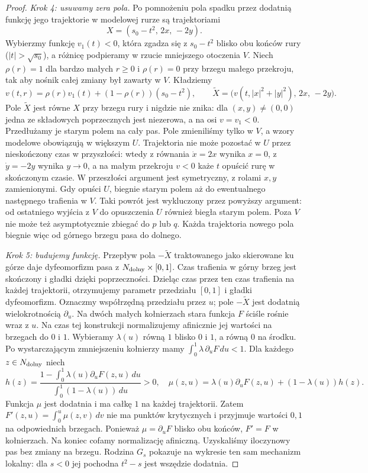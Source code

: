 \begin{proof}
\emph{Krok 4: usuwamy zera pola.}
Po pomnożeniu pola spadku przez
dodatnią funkcję jego trajektorie
w modelowej rurze są trajektoriami
\[
 X=(s_0-t^2,\,2x,\,-2y).
\]
Wybierzmy funkcję $v_1(t)<0$,
która zgadza się z $s_0-t^2$
blisko obu końców rury
($|t|>\sqrt{s_0}$), a różnicę podpieramy
w rzucie mniejszego otoczenia $V$. Niech
$\rho(r)=1$ dla bardzo małych
$r\geq0$ i $\rho(r)=0$ przy
brzegu małego przekroju, tak aby nośnik całej
zmiany był zawarty w $V$. Kładziemy
\[
 v(t,r)=\rho(r)v_1(t)
       +(1-\rho(r))(s_0-t^2),\qquad
 \widetilde X=
 \bigl(v(t,|x|^2+|y|^2),\,2x,\,-2y\bigr).
\]
Pole $\widetilde X$ jest równe $X$
przy brzegu rury i nigdzie nie
znika: dla $(x,y)\ne(0,0)$ jedna
ze składowych poprzecznych jest
niezerowa, a na osi $v=v_1<0$.
Przedłużamy je starym polem na cały pas.
Pole zmieniliśmy tylko w $V$, a wzory modelowe
obowiązują w większym $U$. Trajektoria nie może
pozostać w $U$ przez nieskończony czas
w przyszłości: wtedy z równania
$\dot x=2x$ wynika $x=0$,
z $\dot y=-2y$ wynika $y\to0$,
a na małym przekroju $v<0$
każe $t$ opuścić rurę w skończonym
czasie. W przeszłości argument
jest symetryczny, z rolami $x,y$
zamienionymi. Gdy opuści $U$, biegnie starym polem
aż do ewentualnego następnego trafienia w $V$.
Taki powrót jest wykluczony przez powyższy argument:
od ostatniego wyjścia z $V$ do opuszczenia $U$
również biegła starym polem. Poza $V$ nie może
też asymptotycznie zbiegać do $p$ lub $q$.
Każda trajektoria nowego pola biegnie więc od górnego
brzegu pasa do dolnego.

\emph{Krok 5: budujemy funkcję.}
Przepływ pola $-\widetilde X$
traktowanego jako skierowane ku
górze daje dyfeomorfizm pasa
z $N_{\rm dolny}\times[0,1]$.
Czas trafienia w górny brzeg jest skończony
i gładki dzięki poprzeczności. Dzieląc czas przez
ten czas trafienia na każdej trajektorii, otrzymujemy
parametr przedziału $[0,1]$ i gładki dyfeomorfizm.
Oznaczmy współrzędną przedziału przez $u$; pole $-\widetilde X$
jest dodatnią wielokrotnością
$\partial_u$. Na dwóch małych
kołnierzach stara funkcja $F$
ściśle rośnie wraz z $u$.
Na czas tej konstrukcji normalizujemy
afinicznie jej wartości na brzegach
do $0$ i $1$.
Wybieramy $\lambda(u)$ równą $1$
blisko $0$ i $1$, a równą $0$
na środku. Po wystarczającym
zmniejszeniu kołnierzy mamy
$\int_0^1\lambda\,\partial_uF\,du<1$.
Dla każdego $z\in N_{\rm dolny}$ niech
\[
 h(z)=
 \frac{1-\int_0^1\lambda(u)
                 \partial_uF(z,u)\,du}
      {\int_0^1(1-\lambda(u))\,du}>0,
 \quad
 \mu(z,u)=\lambda(u)\partial_uF(z,u)
            +(1-\lambda(u))h(z).
\]
Funkcja $\mu$ jest dodatnia i ma
całkę $1$ na każdej trajektorii.
Zatem $F'(z,u)=\int_0^u\mu(z,v)\,dv$
nie ma punktów krytycznych i przyjmuje
wartości $0,1$ na odpowiednich brzegach.
Ponieważ $\mu=\partial_uF$ blisko
obu końców, $F'=F$ w kołnierzach.
Na koniec cofamy normalizację afiniczną.
Uzyskaliśmy iloczynowy pas bez
zmiany na brzegu. Rodzina $G_s$
pokazuje na wykresie ten sam
mechanizm lokalny: dla $s<0$
jej pochodna $t^2-s$ jest
wszędzie dodatnia.
\end{proof}


